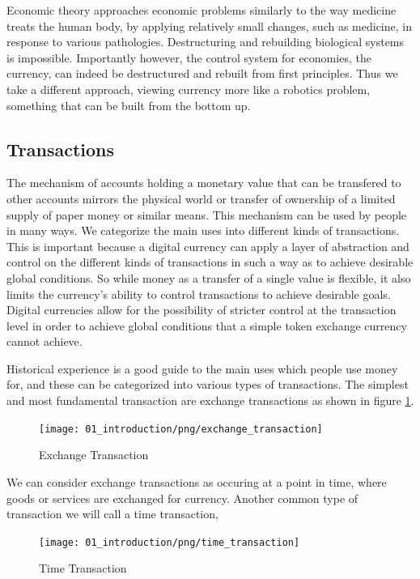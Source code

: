 Economic theory approaches economic problems similarly to the way medicine treats the human body, by
applying relatively small changes, such as medicine, in response to various pathologies.
Destructuring and rebuilding biological systems is impossible. Importantly however, the control
system for economies, the currency, can indeed be destructured and rebuilt from first principles.
Thus we take a different approach, viewing currency more like a robotics problem, something that can
be built from the bottom up.

\subsection{Transactions}

The mechanism of accounts holding a monetary value that can be transfered to other accounts mirrors
the physical world or transfer of ownership of a limited supply of paper money or similar means.
This mechanism can be used by people in many ways. We categorize the main uses into different kinds
of transactions. This is important because a digital currency can apply a layer of abstraction and
control on the different kinds of transactions in such a way as to achieve desirable global
conditions. So while money as a transfer of a single value is flexible, it also limits the
currency's ability to control transactions to achieve desirable goals. Digital currencies allow for
the possibility of stricter control at the transaction level in order to achieve global conditions
that a simple token exchange currency cannot achieve. 

Historical experience is a good guide to the main uses which people use money for,
and these can be categorized into various types of transactions. The simplest and most fundamental
transaction are exchange transactions as shown in figure \ref{fig:exchange_transaction1}.

\begin{figure}[H]
\centering
\texttt{[image: 01\_introduction/png/exchange\_transaction]}
\caption{Exchange Transaction}
\label{fig:exchange_transaction1}
\end{figure}

We can consider exchange transactions as occuring at a point in time, where goods or services are
exchanged for currency. Another common type of transaction we will call a time transaction,

\begin{figure}[H]
\centering
\texttt{[image: 01\_introduction/png/time\_transaction]}
\caption{Time Transaction}
\label{fig:time_transaction1}
\end{figure}

